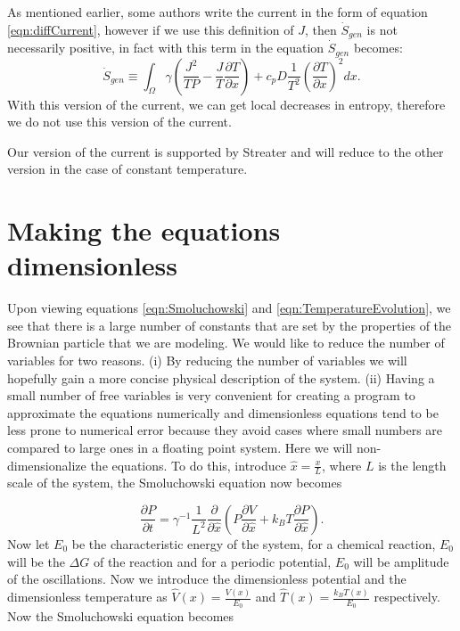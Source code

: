 As mentioned earlier, some authors write the current in the form of equation \ref{eqn:diffCurrent}, however if we use this definition of $J$, then $\dot{S}_{gen}$ is not necessarily positive, in fact with this term in the equation $\dot{S}_{gen}$ becomes:
\begin{equation}
\dot{S}_{gen} \equiv \int_{\Omega} \gamma \left(\frac{J^2}{T P} - \frac{J}{T} \frac{\partial T}{\partial x} \right) + c_p D \frac{1}{T^2} \left(\frac{\partial T}{\partial x} \right)^2 dx.
\end{equation}
With this version of the current, we can get local decreases in entropy, therefore we do not use this version of the current.

Our version of the current is supported by Streater \cite{Streater1997, Streater1997a,Streater2000,Streater1997b} and will reduce to the other version in the case of constant temperature.

\section{Making the equations dimensionless}  \label{dimensionless}

Upon viewing equations \ref{eqn:Smoluchowski} and \ref{eqn:TemperatureEvolution}, we see that there is a large number of constants that are set by the properties of the Brownian particle that we are modeling. We would like to reduce the number of variables for two reasons. (i) By reducing the number of variables we will hopefully gain a more concise physical description of the system. (ii) Having a small number of free variables is very convenient for creating a program to approximate the equations numerically and dimensionless equations tend to be less prone to numerical error because they avoid cases where small numbers are compared to large ones in a floating point system.
Here we will non-dimensionalize the equations. To do this, introduce $\hat{x} = \frac{x}{L}$, where $L$ is the length scale of the system, the Smoluchowski equation now becomes

\begin{equation}
\frac{\partial P}{\partial t} = \gamma^{-1}\frac{1}{L^2} \frac{\partial}{\partial \hat{x}} \left (P \frac{\partial V}{\partial \hat{x}} + k_B T \frac{\partial P}{\partial \hat{x}} \right ).
\end{equation}
Now let $E_0$ be the characteristic energy of the system, for a chemical reaction, $E_0$ will be the $\Delta G$ of the reaction and for a periodic potential, $E_0$ will be amplitude of the oscillations. Now we introduce the dimensionless potential and the dimensionless temperature as $\hat{V}(x) = \frac{V(x)}{E_0}$ and $\hat{T}(x) = \frac{k_B T(x)}{E_0}$ respectively. Now the Smoluchowski equation becomes

